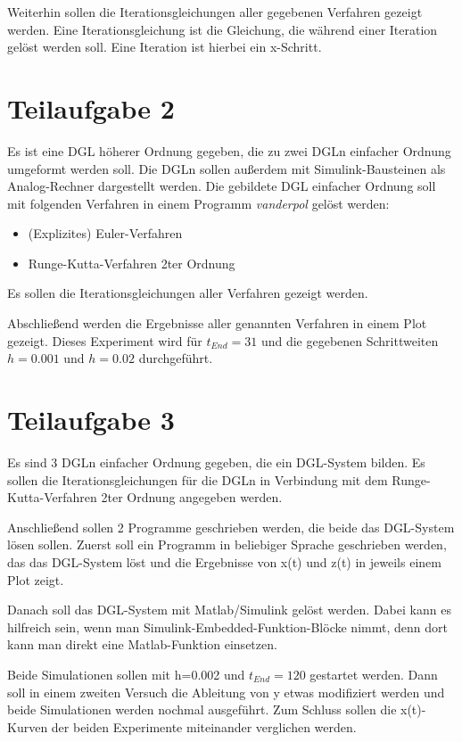 \documentclass[]{scrartcl}
\begin{document}
Weiterhin sollen die Iterationsgleichungen aller gegebenen Verfahren gezeigt werden. Eine Iterationsgleichung ist die Gleichung, die während einer Iteration gelöst werden soll. Eine Iteration ist hierbei ein x-Schritt.

\section{Teilaufgabe 2}
Es ist eine DGL höherer Ordnung gegeben, die zu zwei DGLn einfacher Ordnung umgeformt werden soll. Die DGLn sollen außerdem mit Simulink-Bausteinen als Analog-Rechner dargestellt werden. Die gebildete DGL einfacher Ordnung soll mit folgenden Verfahren in einem Programm \textit{vanderpol} gelöst werden:

\begin{itemize}
	\item (Explizites) Euler-Verfahren
	\item Runge-Kutta-Verfahren 2ter Ordnung
\end{itemize}

Es sollen die Iterationsgleichungen aller Verfahren gezeigt werden.

Abschließend werden die Ergebnisse aller genannten Verfahren in einem Plot gezeigt. Dieses Experiment wird für $t_{End} = 31$ und die gegebenen Schrittweiten $h=0.001$ und $h=0.02$ durchgeführt.

\section{Teilaufgabe 3}
Es sind 3 DGLn einfacher Ordnung gegeben, die ein DGL-System bilden. Es sollen die Iterationsgleichungen für die DGLn in Verbindung mit dem Runge-Kutta-Verfahren 2ter Ordnung angegeben werden.

Anschließend sollen 2 Programme geschrieben werden, die beide das DGL-System lösen sollen. Zuerst soll ein Programm in beliebiger Sprache geschrieben werden, das das DGL-System löst und die Ergebnisse von x(t) und z(t) in jeweils einem Plot zeigt.

Danach soll das DGL-System mit Matlab/Simulink gelöst werden. Dabei kann es hilfreich sein, wenn man Simulink-Embedded-Funktion-Blöcke nimmt, denn dort kann man direkt eine Matlab-Funktion einsetzen.

Beide Simulationen sollen mit h=0.002 und $t_{End}=120$ gestartet werden. Dann soll in einem zweiten Versuch die Ableitung von y etwas modifiziert werden und beide Simulationen werden nochmal ausgeführt. Zum Schluss sollen die x(t)-Kurven der beiden Experimente miteinander verglichen werden.
\end{document}
